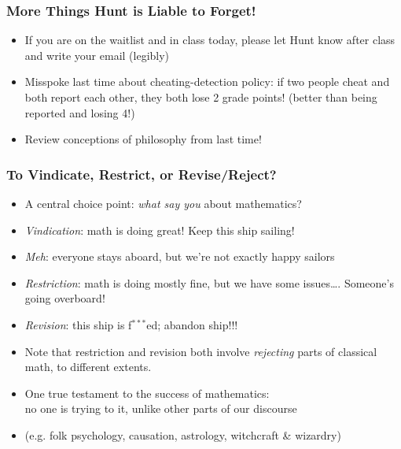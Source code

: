 \begin{frame}
\frametitle{More Things Hunt is Liable to Forget!}

\begin{itemize}[<+->]

\item If you are on the waitlist and in class today, please let Hunt know after class and write your email (legibly) 

\item Misspoke last time about cheating-detection policy: if two people cheat and both report each other, they both lose 2 grade points! (better than being reported and losing 4!)

\item Review conceptions of philosophy from last time!


\end{itemize}
\end{frame}

\begin{frame}
\frametitle{To Vindicate, Restrict, or Revise/Reject?}

\begin{itemize}[<+->]

\item A central choice point: \textit{what say you} about mathematics?

\item \emph{Vindication}: math is doing great! Keep this ship sailing!

\item \emph{Meh}: everyone stays aboard, but we're not exactly happy sailors

\item \emph{Restriction}: math is doing mostly fine, but we have some issues\dots. Someone's going overboard! 

\item \emph{Revision}: this ship is f$^{***}$ed; abandon ship!!! 

\item Note that restriction and revision both involve \textit{rejecting} parts of classical math, to different extents. 

\item One true testament to the success of mathematics: \\ no one is trying to  it, unlike other parts of our discourse 
\item[] (e.g. folk psychology, causation, astrology, witchcraft \& wizardry)



\end{itemize}
\end{frame}



